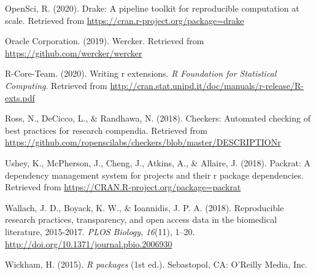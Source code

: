 \documentclass[12pt,twoside]{reedthesis}
\begin{document}
\hypertarget{ref-R-drake}{}
OpenSci, R. (2020). Drake: A pipeline toolkit for reproducible
computation at scale. Retrieved from
\url{https://cran.r-project.org/package=drake}

\hypertarget{ref-wercker}{}
Oracle Corporation. (2019). Wercker. Retrieved from
\url{https://github.com/wercker/wercker}

\hypertarget{ref-coreteam-extensions}{}
R-Core-Team. (2020). Writing r extensions. \emph{R Foundation for
Statistical Computing}. Retrieved from
\url{http://cran.stat.unipd.it/doc/manuals/r-release/R-exts.pdf}

\hypertarget{ref-R-checkers}{}
Ross, N., DeCicco, L., \& Randhawa, N. (2018). Checkers: Automated
checking of best practices for research compendia. Retrieved from
\url{https://github.com/ropenscilabs/checkers/blob/master/DESCRIPTIONr}

\hypertarget{ref-R-packrat}{}
Ushey, K., McPherson, J., Cheng, J., Atkins, A., \& Allaire, J. (2018).
Packrat: A dependency management system for projects and their r package
dependencies. Retrieved from
\url{https://CRAN.R-project.org/package=packrat}

\hypertarget{ref-plos-biology}{}
Wallach, J. D., Boyack, K. W., \& Ioannidis, J. P. A. (2018).
Reproducible research practices, transparency, and open access data in
the biomedical literature, 2015-2017. \emph{PLOS Biology},
\emph{16}(11), 1--20. \url{http://doi.org/10.1371/journal.pbio.2006930}

\hypertarget{ref-hadley-packages}{}
Wickham, H. (2015). \emph{R packages} (1st ed.). Sebastopol, CA:
O'Reilly Media, Inc.


\end{document}
